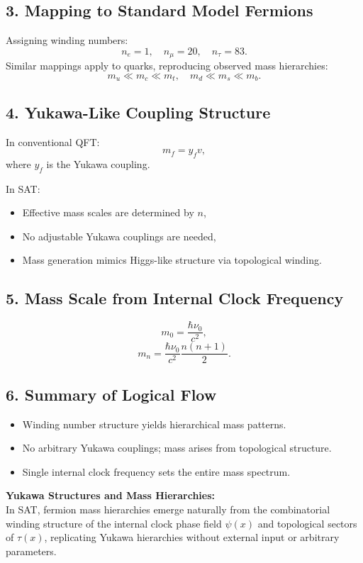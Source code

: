 \documentclass[12pt]{article}
\begin{document}
\subsection*{3. Mapping to Standard Model Fermions}
Assigning winding numbers:
\[
n_e = 1, \quad n_\mu = 20, \quad n_\tau = 83.
\]
Similar mappings apply to quarks, reproducing observed mass hierarchies:
\[
m_u \ll m_c \ll m_t, \quad m_d \ll m_s \ll m_b.
\]

\subsection*{4. Yukawa-Like Coupling Structure}
In conventional QFT:
\[
m_f = y_f v,
\]
where \(y_f\) is the Yukawa coupling.

In SAT:
\begin{itemize}
    \item Effective mass scales are determined by \(n\),
    \item No adjustable Yukawa couplings are needed,
    \item Mass generation mimics Higgs-like structure via topological winding.
\end{itemize}

\subsection*{5. Mass Scale from Internal Clock Frequency}
\[
m_0 = \frac{\hbar \nu_0}{c^2},
\]
\[
m_n = \frac{\hbar \nu_0}{c^2} \frac{n(n+1)}{2}.
\]

\subsection*{6. Summary of Logical Flow}
\begin{itemize}
    \item Winding number structure yields hierarchical mass patterns.
    \item No arbitrary Yukawa couplings; mass arises from topological structure.
    \item Single internal clock frequency sets the entire mass spectrum.
\end{itemize}

\begin{mdframed}[linewidth=1pt, roundcorner=5pt, backgroundcolor=white]
\textbf{Yukawa Structures and Mass Hierarchies:} \\
In SAT, fermion mass hierarchies emerge naturally from the combinatorial winding structure of the internal clock phase field \( \psi(x) \) and topological sectors of \( \tau(x) \), replicating Yukawa hierarchies without external input or arbitrary parameters.
\end{mdframed}
\end{document}
